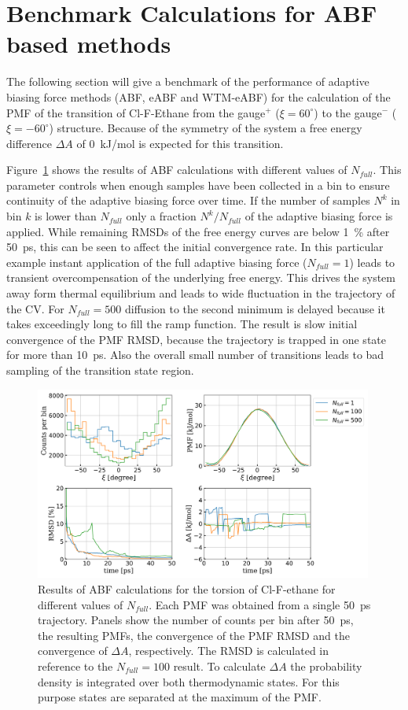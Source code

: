 \section{Benchmark Calculations for ABF based methods}
\label{sec:test}
The following section will give a benchmark of the performance of adaptive biasing force methods (ABF, eABF and WTM-eABF) for the calculation of the PMF of the transition of Cl-F-Ethane from the gauge$^+$ ($\xi=60^\circ$) to the gauge$^-$ ($\xi=-60^\circ$) structure.
Because of the symmetry of the system a free energy difference $\Delta A$ of 0~kJ/mol is expected for this transition.

Figure~\ref{fig:ABF benchmark} shows the results of ABF calculations with different values of $N_{full}$.
This parameter controls when enough samples have been collected in a bin to ensure continuity of the adaptive biasing force over time.
If the number of samples $N^k$ in bin $k$ is lower than $N_{full}$ only a fraction $N^k/N_{full}$ of the adaptive biasing force is applied.\autocite{comer2015adaptive}
While remaining RMSDs of the free energy curves are below 1~\% after 50~ps, this can be seen to affect the initial convergence rate.
In this particular example instant application of the full adaptive biasing force ($N_{full}=1$) leads to transient overcompensation of the underlying free energy.
This drives the system away form thermal equilibrium and leads to wide fluctuation in the trajectory of the CV.
For $N_{full}=500$ diffusion to the second minimum is delayed because it takes exceedingly long to fill the ramp function.
The result is slow initial convergence of the PMF RMSD, because the trajectory is trapped in one state for more than 10~ps.
Also the overall small number of transitions leads to bad sampling of the transition state region.
\begin{figure}[H]
    \centering
    \includegraphics[width=0.99\textwidth]{bilder/benchmark/ABF_benchmark_nfull}
    \caption{Results of ABF calculations for the torsion of Cl-F-ethane for different values of $N_{full}$. Each PMF was obtained from a single 50~ps trajectory. Panels show the number of counts per bin after 50~ps, the resulting PMFs, the convergence of the PMF RMSD and the convergence of $\Delta A$, respectively. The RMSD is calculated in reference to the $N_{full}=100$ result. To calculate $\Delta A$ the probability density is integrated over both thermodynamic states. For this purpose states are separated at the maximum of the PMF.}
    \label{fig:ABF benchmark}
\end{figure}
